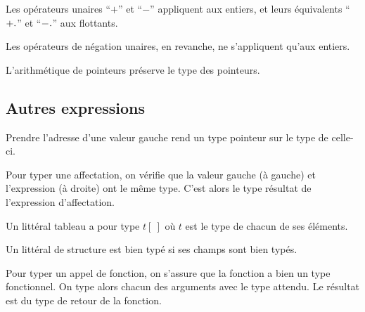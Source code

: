 Les opérateurs unaires \enquote{$+$} et \enquote{$-$} appliquent aux entiers, et
leurs équivalents \enquote{$\floatop{+}$} et \enquote{$\floatop{-}$} aux
flottants.


Les opérateurs de négation unaires, en revanche, ne s'appliquent qu'aux
entiers.

\begin{mathpar}
\end{mathpar}

L'arithmétique de pointeurs préserve le type des pointeurs.

\begin{mathpar}
\end{mathpar}

\subsection*{Autres expressions}

Prendre l'adresse d'une valeur gauche rend un type pointeur sur le type de
celle-ci.

\begin{mathpar}
\end{mathpar}

Pour typer une affectation, on vérifie que la valeur gauche (à gauche) et
l'expression (à droite) ont le même type. C'est alors le type résultat de
l'expression d'affectation.

\begin{mathpar}
\end{mathpar}

Un littéral tableau a pour type $t[~]$ où $t$ est le type de chacun de ses
éléments.

\begin{mathpar}
\end{mathpar}

Un littéral de structure est bien typé si ses champs sont bien typés.

\begin{mathpar}
\end{mathpar}

Pour typer un appel de fonction, on s'assure que la fonction a bien un type
fonctionnel. On type alors chacun des arguments avec le type attendu. Le
résultat est du type de retour de la fonction.

